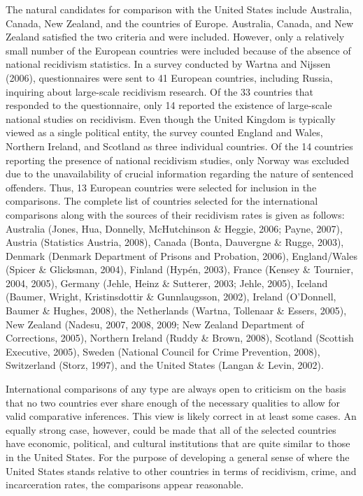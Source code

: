 The natural candidates for comparison with the United States include Australia, Canada, New Zealand, and the countries of Europe.  Australia, Canada, and New Zealand satisfied the two criteria and were included.  However, only a relatively small number of the European countries were included because of the absence of national recidivism statistics.  In a survey conducted by Wartna and Nijssen (2006), questionnaires were sent to 41 European countries, including Russia, inquiring about large-scale recidivism research.  Of the 33 countries that responded to the questionnaire, only 14 reported the existence of large-scale national studies on recidivism.  Even though the United Kingdom is typically viewed as a single political entity, the survey counted England and Wales, Northern Ireland, and Scotland as three individual countries.  Of the 14 countries reporting the presence of national recidivism studies, only Norway was excluded due to the unavailability of crucial information regarding the nature of sentenced offenders.  Thus, 13 European countries were selected for inclusion in the comparisons.  The complete list of countries selected for the international comparisons along with the sources of their recidivism rates is given as follows:  Australia (Jones, Hua, Donnelly, McHutchinson \& Heggie, 2006; Payne, 2007), Austria (Statistics Austria, 2008), Canada (Bonta, Dauvergne \& Rugge, 2003), Denmark (Denmark Department of Prisons and Probation, 2006), England/Wales (Spicer \& Glicksman, 2004), Finland (Hyp\'{e}n, 2003), France (Kensey \& Tournier, 2004, 2005), Germany (Jehle, Heinz \& Sutterer, 2003; Jehle, 2005), Iceland (Baumer, Wright, Kristinsdottir \& Gunnlaugsson, 2002), Ireland (O'Donnell, Baumer \& Hughes, 2008), the Netherlands (Wartna, Tollenaar \& Essers, 2005), New Zealand (Nadesu, 2007, 2008, 2009; New Zealand Department of Corrections, 2005), Northern Ireland (Ruddy \& Brown, 2008), Scotland (Scottish Executive, 2005), Sweden (National Council for Crime Prevention, 2008), Switzerland (Storz, 1997), and the United States (Langan \& Levin, 2002).

International comparisons of any type are always open to criticism on the basis that no two countries ever share enough of the necessary qualities to allow for valid comparative inferences. This view is likely correct in at least some cases.  An equally strong case, however, could be made that all of the selected countries have economic, political, and cultural institutions that are quite similar to those in the United States.  For the purpose of developing a general sense of where the United States stands relative to other countries in terms of recidivism, crime, and incarceration rates, the comparisons appear reasonable.

